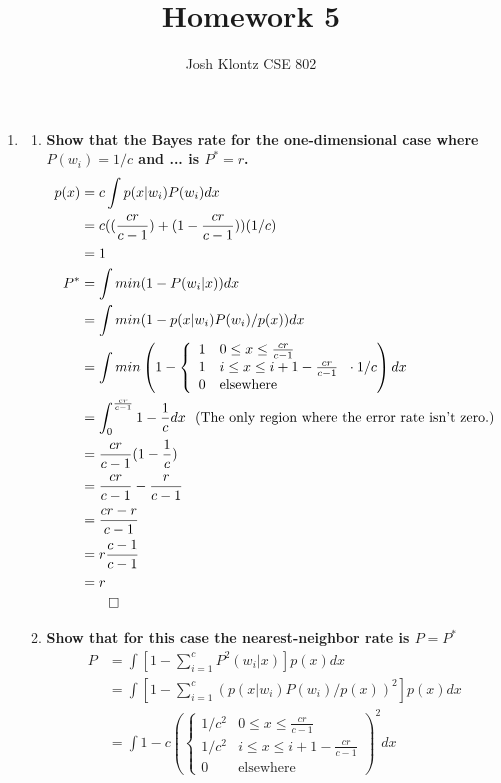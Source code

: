 \documentclass[12pt]{article}
\begin{document}
 
\title{Homework 5}
\author{Josh Klontz
CSE 802}
 
\maketitle

\begin{enumerate}
\item {}
\begin{enumerate}
\item \textbf{Show that the Bayes rate for the one-dimensional case where $P(w_i)=1/c$ and ... is $P^* = r$.}
\begin{equation}
\begin{split}
p(x) &= c\int p(x|w_i)P(w_i) dx \\
       &= c((\frac{cr}{c-1}) + (1 - \frac{cr}{c-1}))(1/c) \\
       &=1 \\
P^* &= \int min(1-P(w_i|x)) dx \\
      &= \int min(1-p(x|w_i)P(w_i)/p(x)) dx \\
      &= \int min \left(1-\left\{ \begin{array}{rl} 1 & 0\leq x \leq \frac{cr}{c-1} \\ 1 & i \leq x \leq i+1-\frac{cr}{c-1} \\ 0 & \text{elsewhere} \end{array} \right. \cdot 1/c \right) dx \\
      &= \int_0^\frac{cr}{c-1}1-\frac{1}{c}dx~~\text{(The only region where the error rate isn't zero.)} \\
      &= \frac{cr}{c-1}(1-\frac{1}{c}) \\
      &= \frac{cr}{c-1} - \frac{r}{c-1} \\
      &= \frac{cr-r}{c-1} \\
      &= r\frac{c-1}{c-1} \\
      &= r \\
      & \qed
\end{split}
\end{equation}
\item \textbf{Show that for this case the nearest-neighbor rate is $P=P^*$}
\begin{equation}
\begin{split}
P &= \int \left[1-\sum_{i=1}^c P^2(w_i|x) \right]p(x)dx \\
   &= \int \left[1-\sum_{i=1}^c (p(x|w_i)P(w_i)/p(x))^2 \right]p(x)dx \\
   &= \int 1-c \left( \left\{ \begin{array}{rl} 1/c^2 & 0\leq x \leq \frac{cr}{c-1} \\ 1/c^2 & i \leq x \leq i+1-\frac{cr}{c-1} \\ 0 & \text{elsewhere} \end{array} \right. \right)^2 dx \\

\end{split}
\end{equation}
\end{enumerate}
\end{enumerate}
\end{document}
